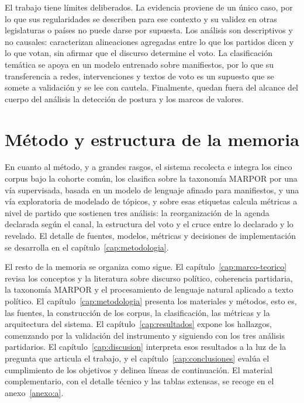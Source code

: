 El trabajo tiene límites deliberados. La evidencia proviene de un único caso, por
lo que sus regularidades se describen para ese contexto y su validez en otras
legislaturas o países no puede darse por supuesta. Los análisis son descriptivos
y no causales: caracterizan alineaciones agregadas entre lo que los partidos
dicen y lo que votan, sin afirmar que el discurso determine el voto. La
clasificación temática se apoya en un modelo entrenado sobre manifiestos, por lo
que su transferencia a redes, intervenciones y textos de voto es un supuesto que
se somete a validación y se lee con cautela. Finalmente, quedan fuera del alcance
del cuerpo del análisis la detección de postura y los marcos de valores.

\section{Método y estructura de la memoria}
\label{sec:estructura}

En cuanto al método, y a grandes rasgos, el sistema recolecta e integra los cinco
corpus bajo la cohorte común, los clasifica sobre la taxonomía MARPOR por una vía
supervisada, basada en un modelo de lenguaje afinado para manifiestos, y una vía
exploratoria de modelado de tópicos, y sobre esas etiquetas calcula métricas a
nivel de partido que sostienen tres análisis: la reorganización de la agenda
declarada según el canal, la estructura del voto y el cruce entre lo declarado y
lo revelado. El detalle de fuentes, modelos, métricas y decisiones de
implementación se desarrolla en el capítulo~\ref{cap:metodologia}.

El resto de la memoria se organiza como sigue. El
capítulo~\ref{cap:marco-teorico} revisa los conceptos y la literatura sobre
discurso político, coherencia partidaria, la taxonomía MARPOR y el procesamiento
de lenguaje natural aplicado a texto político. El
capítulo~\ref{cap:metodologia} presenta los materiales y métodos, esto es, las
fuentes, la construcción de los corpus, la clasificación, las métricas y la
arquitectura del sistema. El capítulo~\ref{cap:resultados} expone los hallazgos,
comenzando por la validación del instrumento y siguiendo con los tres análisis
partidarios. El capítulo~\ref{cap:discusion} interpreta esos resultados a la luz
de la pregunta que articula el trabajo, y el capítulo~\ref{cap:conclusiones}
evalúa el cumplimiento de los objetivos y delinea líneas de continuación. El
material complementario, con el detalle técnico y las tablas extensas, se recoge
en el anexo~\ref{anexo:a}.

